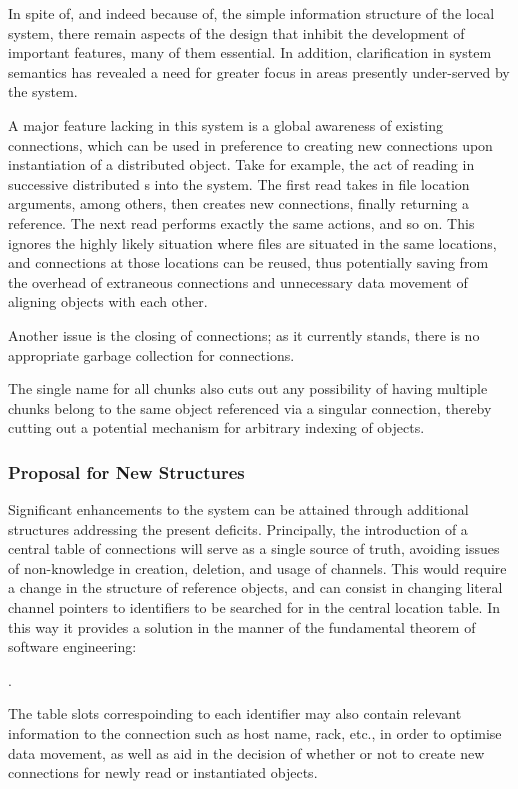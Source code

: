 In spite of, and indeed because of, the simple information structure of
the local system, there remain aspects of the design that inhibit the
development of important features, many of them essential. In addition,
clarification in system semantics has revealed a need for greater focus
in areas presently under-served by the system.

A major feature lacking in this system is a global awareness of existing
connections, which can be used in preference to creating new connections
upon instantiation of a distributed object. Take for example, the act of
reading in successive distributed s into the system. The
first read takes in file location arguments, among others, then creates
new connections, finally returning a reference. The next read performs
exactly the same actions, and so on. This ignores the highly likely
situation where files are situated in the same locations, and
connections at those locations can be reused, thus potentially saving
from the overhead of extraneous connections and unnecessary data
movement of aligning objects with each other.

Another issue is the closing of connections; as it currently stands,
there is no appropriate garbage collection for connections.

The single name for all chunks also cuts out any possibility of having
multiple chunks belong to the same object referenced via a singular
connection, thereby cutting out a potential mechanism for arbitrary
indexing of objects.

\subsubsection{Proposal for New Structures}\label{sec:localproposal}

Significant enhancements to the system can be attained through
additional structures addressing the present deficits. Principally, the
introduction of a central table of connections will serve as a single
source of truth, avoiding issues of non-knowledge in creation, deletion,
and usage of channels. This would require a change in the structure of
reference objects, and can consist in changing literal 
channel pointers to identifiers to be searched for in the central
location table. In this way it provides a solution in the manner of the
fundamental theorem of software engineering:

.

The table slots correspoinding to each identifier may also contain
relevant information to the connection such as host name, rack, etc., in
order to optimise data movement, as well as aid in the decision of
whether or not to create new connections for newly read or instantiated
objects.

